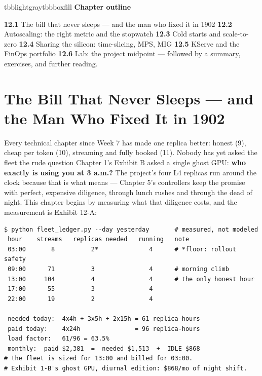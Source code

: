 \vspace{2.5pt}

\begin{calloutbox}{tbblightgray}{tbbboxfill}
{\normalsize\bfseries\color{tbbink}Chapter outline}\par\vspace{3pt}
\textbf{12.1} The bill that never sleeps — and the man who fixed it in 1902    \textbf{12.2} Autoscaling: the right metric and the stopwatch    \textbf{12.3} Cold starts and scale-to-zero    \textbf{12.4} Sharing the silicon: time-slicing, MPS, MIG    \textbf{12.5} KServe and the FinOps portfolio    \textbf{12.6} Lab: the project midpoint — followed by a summary, exercises, and further reading.
\end{calloutbox}

\section{The Bill That Never Sleeps — and the Man Who Fixed It in 1902}

Every technical chapter since Week 7 has made one replica better: honest (9), cheap per token (10), streaming and fully booked (11). Nobody has yet asked the fleet the rude question Chapter 1's Exhibit B asked a single ghost GPU: \textbf{who exactly is using you at 3 a.m.?} The project's four L4 replicas run around the clock because that is what  means — Chapter 5's controllers keep the promise with perfect, expensive diligence, through lunch rushes and through the dead of night. This chapter begins by measuring what that diligence costs, and the measurement is Exhibit 12-A:

\begin{terminalbox}
\begin{Verbatim}[breaklines=true,breakanywhere=true,fontsize=\small,formatcom=\color{tbbtermfg},codes=\tbbcodeactive]
$ python fleet_ledger.py --day yesterday       # measured, not modeled
 hour    streams   replicas needed   running   note
 03:00       8          2*              4      # *floor: rollout safety
 09:00      71          3               4      # morning climb
 13:00     104          4               4      # the only honest hour
 17:00      55          3               4
 22:00      19          2               4

 needed today:  4x4h + 3x5h + 2x15h = 61 replica-hours
 paid today:    4x24h               = 96 replica-hours
 load factor:   61/96 = 63.5%
 monthly:  paid $2,381  =  needed $1,513  +  IDLE $868
# the fleet is sized for 13:00 and billed for 03:00.
# Exhibit 1-B's ghost GPU, diurnal edition: $868/mo of night shift.
\end{Verbatim}
\end{terminalbox}

